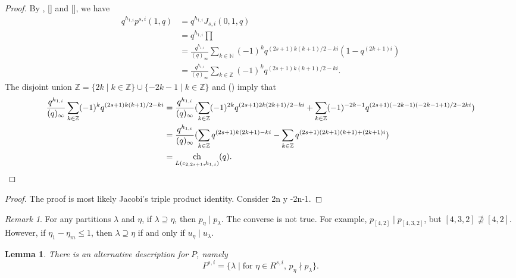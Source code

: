 \documentclass[a4paper, 12pt, reqno]{amsart}
\newtheorem{lemma}[theorem]{Lemma}
\theoremstyle{remark}
\newtheorem{remark}[theorem]{Remark}
\DeclareMathOperator{\ch}{ch}
\begin{document}
\begin{proof}
  By , [] and [], we have
  \begin{align*}
    q^{h_{1, i}}p^{s, i}(1, q) &= q^{h_{1, i}}J_{s, i}(0, 1, q) \\
    &= q^{h_{1, i}}\prod \\
    &= \frac{q^{h_{1, i}}}{(q)_{\infty}}\sum_{k \in \mathbb{N}}(-1)^kq^{(2s + 1)k(k + 1)/2 - ki}(1 - q^{(2k + 1)i}) \\
    &= \frac{q^{h_{1, i}}}{(q)_{\infty}}\sum_{k \in \mathbb{Z}}(-1)^kq^{(2s + 1)k(k + 1)/2 - ki}.
  \end{align*}
  The disjoint union $\mathbb{Z} = \{2k \mid k \in \mathbb{Z}\} \cup \{-2k - 1 \mid k \in \mathbb{Z}\}$ and () imply that
  \begin{align*}
    \frac{q^{h_{1, i}}}{(q)_{\infty}}\sum_{k \in \mathbb{Z}}(-1)^kq^{(2s + 1)k(k + 1)/2 - ki} &= \frac{q^{h_{1, i}}}{(q)_{\infty}}(\sum_{k \in \mathbb{Z}}(-1)^{2k}q^{(2s + 1)2k(2k + 1)/2 - ki} + \sum_{k \in \mathbb{Z}}(-1)^{-2k - 1}q^{(2s + 1)(-2k - 1)(-2k - 1 + 1)/2 - 2ki}) \\
    &= \frac{q^{h_{1, i}}}{(q)_{\infty}}(\sum_{k \in \mathbb{Z}}q^{(2s + 1)k(2k + 1) - ki} - \sum_{k \in \mathbb{Z}}q^{(2s + 1)(2k + 1)(k + 1) + (2k + 1)i}) \\
    &= \ch_{L(c_{2, 2s + 1}, h_{1, i})}(q). \qedhere
  \end{align*}
  
\end{proof}

\begin{proof}
  The proof is most likely Jacobi's triple product identity.
  Consider 2n y -2n-1.
\end{proof}

\begin{remark}
  \label{rmk:9}
  For any partitions $\lambda$ and $\eta$, if $\lambda \supseteq \eta$, then $p_{\eta} \mid p_{\lambda}$.
  The converse is not true.
  For example, $p_{[4, 2]} \mid p_{[4, 3, 2]}$, but $[4, 3, 2] \nsupseteq [4, 2]$.
  However, if $\eta_1 - \eta_m \le 1$, then $\lambda \supseteq \eta$ if and only if $u_{\eta} \mid u_{\lambda}$.
\end{remark}

\begin{lemma}
  \label{lmm:11}
  There is an alternative description for $P$, namely
  \begin{equation*}
    P^{s, i} = \{\lambda \mid \text{for $\eta \in R^{s, i}$, $p_{\eta} \nmid p_{\lambda}$}\}.
  \end{equation*}
\end{lemma}
\end{document}
